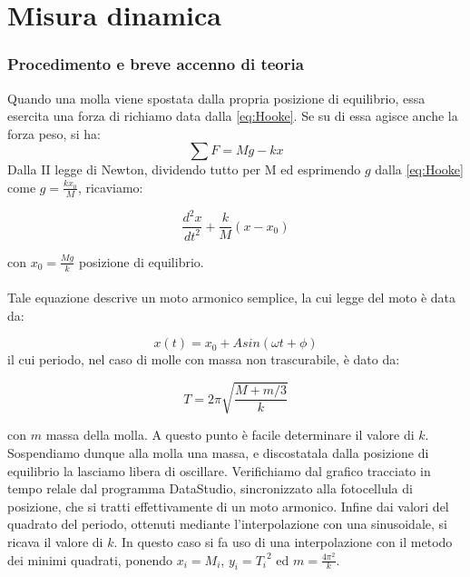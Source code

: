 \begin{center}
\begin{tabular}{c c}
\end{tabular}


\end{center}



\section{Misura dinamica}

\subsubsection{Procedimento e breve accenno di teoria}

Quando una molla viene spostata dalla propria posizione di equilibrio, essa esercita una forza di richiamo data dalla \ref{eq:Hooke}. Se su di essa agisce anche la forza peso, si ha:
$$\displaystyle\sum{F}=Mg-kx$$
Dalla II legge di Newton, dividendo tutto per M ed esprimendo $g$ dalla \ref{eq:Hooke} come $g=\displaystyle{\frac{kx_0}{M}}$, ricaviamo:

\begin{equation}
\frac{d^2x}{dt^2}+\frac{k}{M}(x-x_0)
\end{equation}

con $x_0=\displaystyle{\frac{Mg}{k}}$ posizione di equilibrio.\\
\\
Tale equazione descrive un moto armonico semplice, la cui legge del moto è data da:

\begin{equation}\label{eqmoto}
x(t)=x_0+Asin(\omega t+\phi)
\end{equation} 
il cui periodo, nel caso di molle con massa non trascurabile, è dato da:

\begin{equation}\label{periodo}
T=2\pi\sqrt{\frac{M+m/3}{k}}
\end{equation}  

con $m$ massa della molla. A questo punto è facile determinare il valore di $k$. Sospendiamo dunque alla molla una massa, e discostatala dalla posizione di equilibrio la lasciamo libera di oscillare. Verifichiamo dal grafico tracciato in tempo relale dal programma DataStudio, sincronizzato alla fotocellula di posizione, che si tratti effettivamente di un moto armonico. Infine dai valori del quadrato del periodo, ottenuti mediante l'interpolazione con una sinusoidale, si ricava il valore di $k$. In questo caso si fa uso di una interpolazione con il metodo dei minimi quadrati, ponendo $x_i=M_i$, $y_i={T_i}^2$ ed $m=\displaystyle{\frac{4\pi^2}{k}}$. 

